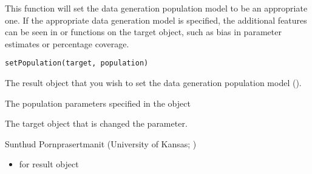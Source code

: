 \documentclass[a4paper]{book}
\begin{document}
%
\begin{Description}\relax
This function will set the data generation population model to be an appropriate one. If the appropriate data generation model is specified, the additional features can be seen in  or  functions on the target object, such as bias in parameter estimates or percentage coverage. 
\end{Description}
%
\begin{Usage}
\begin{verbatim}
setPopulation(target, population)
\end{verbatim}
\end{Usage}
%
\begin{Arguments}
\begin{ldescription}
\item[\code{target}] 
The result object that you wish to set the data generation population model ().

\item[\code{population}] 
The population parameters specified in the  object

\end{ldescription}
\end{Arguments}
%
\begin{Value}
The target object that is changed the parameter.
\end{Value}
%
\begin{Author}\relax
Sunthud Pornprasertmanit (University of Kansas; )
\end{Author}
%
\begin{SeeAlso}\relax
\begin{itemize}

\item {} for result object

\end{itemize}

\end{SeeAlso}
%
\end{document}
